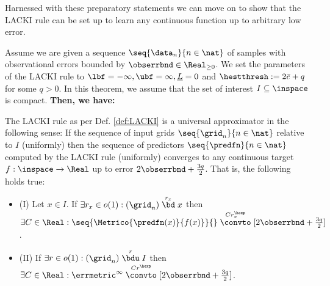 Harnessed with these preparatory statements we can move on to show that the LACKI rule can be set up to learn any continuous function up to arbitrary low error.
\begin{thm}
\label{thm:LACKIuniversality}
Assume we are given a sequence $\seq{\data_n}{n \in \nat}$ of samples with observational errors bounded by $\obserrbnd \in \Real_{\geq 0}$. We set the parameters of the LACKI rule to $\lbf =-\infty,\ubf =\infty, \underline L =0$ and $\hestthresh := 2 \bar e +q $ for some $q >0$. In this theorem, we assume that the set of interest $I \subseteq\inspace$ is compact.
\textbf{Then, we have:}

The LACKI rule as per Def. \ref{def:LACKI} is a universal approximator in the following sense:
If the sequence of input grids $\seq{\grid_n}{n \in \nat}$ relative to $I$ (uniformly) then the sequence of predictors $\seq{\predfn}{n \in \nat}$ computed by the LACKI rule (uniformly) converges to any continuous target $f : \inspace \to \Real$ up to error $2 \obserrbnd + \frac{3q}{2}$.
That is, the following holds true:



\begin{itemize}
\item (I) Let $x \in I$. If $\exists r_x \in o(1): (\grid_n) \stackrel{ r_x}{\bd} x$ then $\exists C \in \Real : \seq{\Metrico{\predfn(x)}{f(x)}}{ } \stackrel{C r_x^\hexp}{\convto}[2\obserrbnd + \frac{3q}{2}]$.
\item (II) If $\exists r \in o(1): (\grid_n) \stackrel{ r}{\bdu} I$ then $\exists C \in \Real : {\errmetric^\infty}{ } \stackrel{C r^\hexp}{\convto}[2\obserrbnd + \frac{3q}{2}]$.
\end{itemize}
\end{thm}
